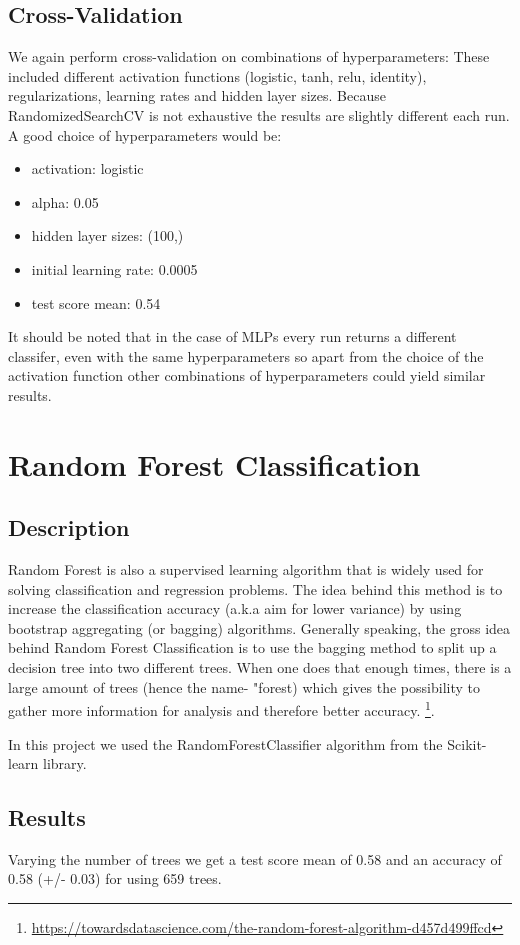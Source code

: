 \documentclass[twocolumn]{scrartcl}
\begin{document}
\subsection{Cross-Validation}
We again perform cross-validation on combinations of hyperparameters: These included different activation functions (logistic, tanh, relu, identity), regularizations, learning rates and hidden layer sizes. Because RandomizedSearchCV is not exhaustive the results are slightly different each run. A good choice of hyperparameters would be:
\begin{itemize}
    \item{activation: logistic}
    \item{alpha: 0.05}
    \item{hidden layer sizes: (100,)}
    \item{initial learning rate: 0.0005}
    \item{test score mean: 0.54}
\end{itemize}
It should be noted that in the case of MLPs every run returns a different classifer, even with the same hyperparameters so apart from the choice of the activation function other combinations of hyperparameters could yield similar results.

\section{Random Forest Classification}
\subsection{Description}
Random Forest is also a supervised learning algorithm that is widely used for solving classification and regression problems. The idea behind this method is to increase the classification accuracy (a.k.a aim for lower variance) by using bootstrap aggregating (or bagging) algorithms. Generally speaking, the gross idea behind Random Forest Classification is to use the bagging method to split up a decision tree into two different trees. When one does that enough times, there is a large amount of trees (hence the name- "forest) which gives the possibility to gather more information for analysis and therefore better accuracy. \footnote{\url{https://towardsdatascience.com/the-random-forest-algorithm-d457d499ffcd}}.

In this project we used the RandomForestClassifier algorithm from the Scikit-learn library.
\subsection{Results}
Varying the number of trees we get a test score mean of 0.58 and an accuracy of 0.58 (+/- 0.03) for using 659 trees.
\end{document}
